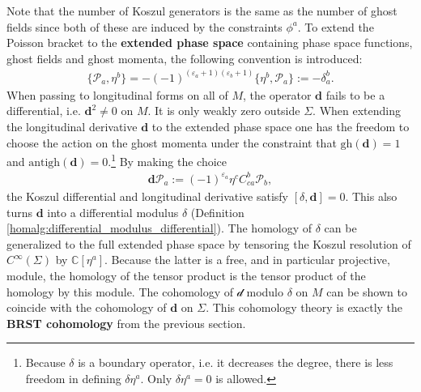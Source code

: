     Note that the number of Koszul generators is the same as the number of ghost fields since both of these are induced by the constraints $\phi^a$. To extend the Poisson bracket to the \textbf{extended phase space} containing phase space functions, ghost fields and ghost momenta, the following convention is introduced:
    \begin{gather}
        \{\mathcal{P}_a,\eta^b\} = -(-1)^{(\varepsilon_a+1)(\varepsilon_b+1)}\{\eta^b,\mathcal{P}_a\} := -\delta_a^b.
    \end{gather}
    When passing to longitudinal forms on all of $M$, the operator $\mathbf{d}$ fails to be a differential, i.e. $\mathbf{d}^2\neq0$ on $M$. It is only weakly zero outside $\Sigma$. When extending the longitudinal derivative $\mathbf{d}$ to the extended phase space one has the freedom to choose the action on the ghost momenta under the constraint that $\text{gh}(\mathbf{d})=1$ and $\text{antigh}(\mathbf{d})=0$.\footnote{Because $\delta$ is a boundary operator, i.e. it decreases the degree, there is less freedom in defining $\delta\eta^a$. Only $\delta\eta^a=0$ is allowed.} By making the choice
    \begin{gather}
        \mathbf{d}\mathcal{P}_a := (-1)^{\varepsilon_a}\eta^c C^b_{ca}\mathcal{P}_b,
    \end{gather}
    the Koszul differential and longitudinal derivative satisfy $[\delta,\mathbf{d}]=0$. This also turns $\mathbf{d}$ into a differential modulus $\delta$ (Definition \ref{homalg:differential_modulus_differential}). The homology of $\delta$ can be generalized to the full extended phase space by tensoring the Koszul resolution of $C^\infty(\Sigma)$ by $\mathbb{C}[\eta^a]$. Because the latter is a free, and in particular projective, module, the homology of the tensor product is the tensor product of the homology by this module. The cohomology of $\mathcal{d}$ modulo $\delta$ on $M$ can be shown to coincide with the cohomology of $\mathbf{d}$ on $\Sigma$. This cohomology theory is exactly the \textbf{BRST cohomology} from the previous section.

